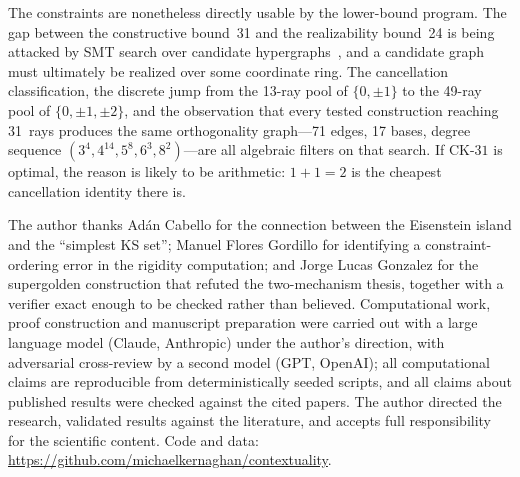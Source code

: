 \documentclass[twocolumn,prl,superscriptaddress,nofootinbib]{revtex4-2}
\newcommand{\CK}{\mathrm{CK}\text{-}31}
\begin{document}
The constraints are nonetheless directly usable by the lower-bound program.  The
gap between the constructive bound~31 and the realizability bound~24 is being
attacked by SMT search over candidate hypergraphs~\cite{LiBrightGanesh2024,KirchwegarPeitlSzeider2023},
and a candidate graph must ultimately be realized over some coordinate ring.  The
cancellation classification, the discrete jump from the 13-ray pool of
$\{0,\pm1\}$ to the 49-ray pool of $\{0,\pm1,\pm2\}$, and the observation that
every tested construction reaching 31~rays produces the same orthogonality
graph---71 edges, 17 bases, degree sequence $(3^4,4^{14},5^8,6^3,8^2)$---are all
algebraic filters on that search.  If $\CK$ is optimal, the reason is likely to be
arithmetic: $1+1=2$ is the cheapest cancellation identity there is.

\begin{acknowledgments}
The author thanks Ad\'an Cabello for the connection between the Eisenstein island
and the ``simplest KS set''; Manuel Flores Gordillo for identifying a
constraint-ordering error in the rigidity computation; and Jorge Lucas Gonzalez
for the supergolden construction that refuted the two-mechanism thesis, together
with a verifier exact enough to be checked rather than believed.  Computational
work, proof construction and manuscript preparation were carried out with a large
language model (Claude, Anthropic) under the author's direction, with adversarial
cross-review by a second model (GPT, OpenAI); all computational claims are
reproducible from deterministically seeded scripts, and all claims about published
results were checked against the cited papers.  The author directed the research,
validated results against the literature, and accepts full responsibility for the
scientific content.  Code and data:
\url{https://github.com/michaelkernaghan/contextuality}.
\end{acknowledgments}
\end{document}
